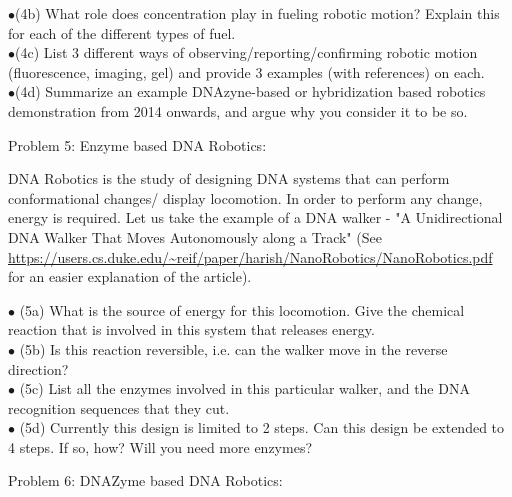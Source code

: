 \documentclass{article}
\begin{document}
$\bullet$(4b) What role does concentration play in fueling robotic motion? Explain this for each of the different types of fuel.  \\

$\bullet$(4c) List 3 different ways of observing/reporting/confirming robotic motion (fluorescence, imaging, gel) and provide 3 examples (with references) on each.  \\

$\bullet$(4d) Summarize an example DNAzyne-based or hybridization based robotics demonstration from 2014 onwards, and argue why you consider it to be so.







\newpage
\centerline{\sc Problem 5:  Enzyme based DNA Robotics:}
\vspace{0.2in}
DNA Robotics is the study of designing DNA systems that can perform conformational changes/ display locomotion. In order to perform any change, energy is required. Let us take the example of a DNA walker - 
"A Unidirectional DNA Walker That Moves Autonomously along a Track"
(See \url{ https://users.cs.duke.edu/~reif/paper/harish/NanoRobotics/NanoRobotics.pdf } for an easier explanation of the article).


$\bullet$ (5a) What is the source of energy for this locomotion. Give the chemical reaction that is involved in this system that releases energy.\\

$\bullet$ (5b) Is this reaction reversible, i.e. can the walker move in the reverse direction?\\


$\bullet$ (5c) List all the enzymes involved in this particular walker, and the DNA recognition sequences that they cut. \\

$\bullet$ (5d) Currently this design is limited to 2 steps. Can this design be extended to 4 steps. If so, how? Will you need more enzymes?\\





\newpage
\centerline{\sc Problem 6:    DNAZyme based DNA Robotics:}
\vspace{0.2in}
\end{document}
